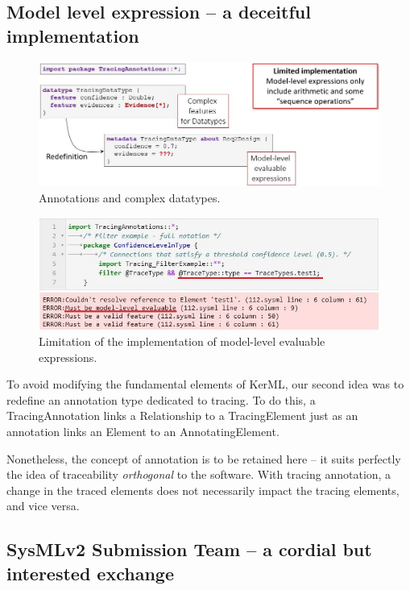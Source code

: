 \subsection{Model level expression -- a deceitful implementation}
\begin{figure}[h]     
	\centering
	\includegraphics[width=.95\linewidth]{images/strategy4-metadatatype.jpg}
	\caption{Annotations and complex datatypes. }
	\label{fig:metadatatypes}
\end{figure}

\begin{figure}[ht]     
	\centering
	\includegraphics[width=.99\linewidth]{images/viz_filterexample_err.JPG}
	\caption{Limitation of the implementation of model-level evaluable expressions.}
	\label{fig:filtererr}
\end{figure}
To avoid modifying the fundamental elements of {KerML}, our second idea was to redefine an annotation type dedicated to tracing. To do this, a TracingAnnotation links a Relationship to a TracingElement just as an annotation links an Element to an AnnotatingElement. 


Nonetheless, the concept of annotation is to be retained here -- it suits perfectly the idea of traceability \textit{orthogonal} to the software. With tracing annotation, a change in the traced elements does not necessarily impact the tracing elements, and vice versa.

\subsection{SysMLv2 Submission Team -- a cordial but interested exchange}